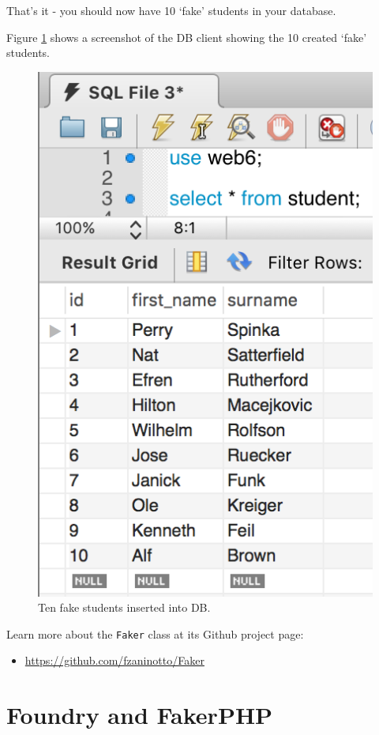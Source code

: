 \documentclass[a4paperpaper,openright]{book}
\providecommand{\tightlist}{%
  \setlength{\itemsep}{0pt}\setlength{\parskip}{0pt}}
\begin{document}
That's it - you should now have 10 `fake' students in your database.

Figure \ref{fake_students} shows a screenshot of the DB client showing
the 10 created `fake' students.

\begin{figure}
\centering
\includegraphics{./tex2pdf.-8aed53dcd332a606/7031b6bf5e162a6ef9ab7d3ff115b3c0a2ca96cc.png}
\caption{Ten fake students inserted into DB. \label{fake_students}}
\end{figure}

Learn more about the \texttt{Faker} class at its Github project page:

\begin{itemize}
\tightlist
\item
  \url{https://github.com/fzaninotto/Faker}
\end{itemize}

\hypertarget{foundry-and-fakerphp}{%
\section{Foundry and FakerPHP}\label{foundry-and-fakerphp}}
\end{document}
